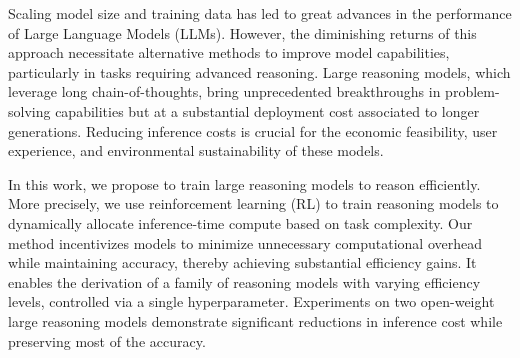 Scaling model size and training data has led to great advances in the performance of Large Language Models (LLMs). However, the diminishing returns of this approach necessitate alternative methods to improve model capabilities, particularly in tasks requiring advanced reasoning. Large reasoning models, which leverage long chain-of-thoughts, bring unprecedented breakthroughs in  problem-solving capabilities but at a substantial deployment cost associated to longer generations. Reducing inference costs is crucial for the economic feasibility, user experience, and environmental sustainability of these models.

In this work, we propose to train large reasoning models to reason efficiently.
More precisely, we use reinforcement learning (RL) to train reasoning models to dynamically allocate inference-time compute based on task complexity. Our method incentivizes models to minimize unnecessary computational overhead while maintaining accuracy, thereby achieving substantial efficiency gains. It  enables the derivation of a family of reasoning models with varying efficiency levels, controlled via a single hyperparameter. Experiments on two open-weight large reasoning models demonstrate significant reductions in inference cost while preserving most of the accuracy. 
